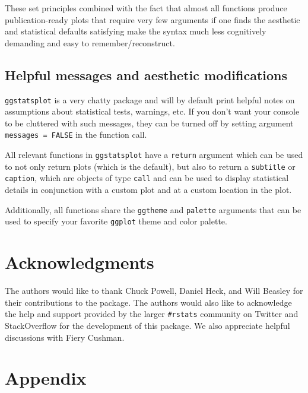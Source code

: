 \documentclass[
]{article}
\begin{document}
These set principles combined with the fact that almost all functions produce
publication-ready plots that require very few arguments if one finds the
aesthetic and statistical defaults satisfying make the syntax much less
cognitively demanding and easy to remember/reconstruct.

\hypertarget{helpful-messages-and-aesthetic-modifications}{%
\subsection{Helpful messages and aesthetic modifications}\label{helpful-messages-and-aesthetic-modifications}}

\texttt{ggstatsplot} is a very chatty package and will by default print helpful notes
on assumptions about statistical tests, warnings, etc. If you don't want your
console to be cluttered with such messages, they can be turned off by setting
argument \texttt{messages\ =\ FALSE} in the function call.

All relevant functions in \texttt{ggstatsplot} have a \texttt{return} argument which can be
used to not only return plots (which is the default), but also to return a
\texttt{subtitle} or \texttt{caption}, which are objects of type \texttt{call} and can be used to
display statistical details in conjunction with a custom plot and at a custom
location in the plot.

Additionally, all functions share the \texttt{ggtheme} and \texttt{palette} arguments that can
be used to specify your favorite \texttt{ggplot} theme and color palette.

\hypertarget{acknowledgments}{%
\section{Acknowledgments}\label{acknowledgments}}

The authors would like to thank Chuck Powell, Daniel Heck, and Will Beasley for
their contributions to the package. The authors would also like to acknowledge
the help and support provided by the larger \texttt{\#rstats} community on Twitter and
StackOverflow for the development of this package. We also appreciate helpful
discussions with Fiery Cushman.

\newpage

\hypertarget{appendix}{%
\section{Appendix}\label{appendix}}
\end{document}
